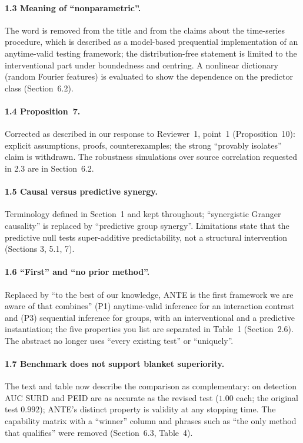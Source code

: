 \documentclass[11pt,a4paper]{article}
\begin{document}
\paragraph{1.3 Meaning of ``nonparametric''.} The word is removed from the title and from the claims about the time-series procedure, which is described as a model-based prequential implementation of an anytime-valid testing framework; the distribution-free statement is limited to the interventional part under boundedness and centring. A nonlinear dictionary (random Fourier features) is evaluated to show the dependence on the predictor class (Section~6.2).

\paragraph{1.4 Proposition~7.} Corrected as described in our response to Reviewer~1, point~1 (Proposition~10): explicit assumptions, proofs, counterexamples; the strong ``provably isolates'' claim is withdrawn. The robustness simulations over source correlation requested in 2.3 are in Section~6.2.

\paragraph{1.5 Causal versus predictive synergy.} Terminology defined in Section~1 and kept throughout; ``synergistic Granger causality'' is replaced by ``predictive group synergy''. Limitations state that the predictive null tests super-additive predictability, not a structural intervention (Sections 3, 5.1, 7).

\paragraph{1.6 ``First'' and ``no prior method''.} Replaced by ``to the best of our knowledge, ANTE is the first framework we are aware of that combines'' (P1) anytime-valid inference for an interaction contrast and (P3) sequential inference for groups, with an interventional and a predictive instantiation; the five properties you list are separated in Table~1 (Section~2.6). The abstract no longer uses ``every existing test'' or ``uniquely''.

\paragraph{1.7 Benchmark does not support blanket superiority.} The text and table now describe the comparison as complementary: on detection AUC SURD and PEID are as accurate as the revised test ($1.00$ each; the original test $0.992$); ANTE's distinct property is validity at any stopping time. The capability matrix with a ``winner'' column and phrases such as ``the only method that qualifies'' were removed (Section~6.3, Table~4).
\end{document}
